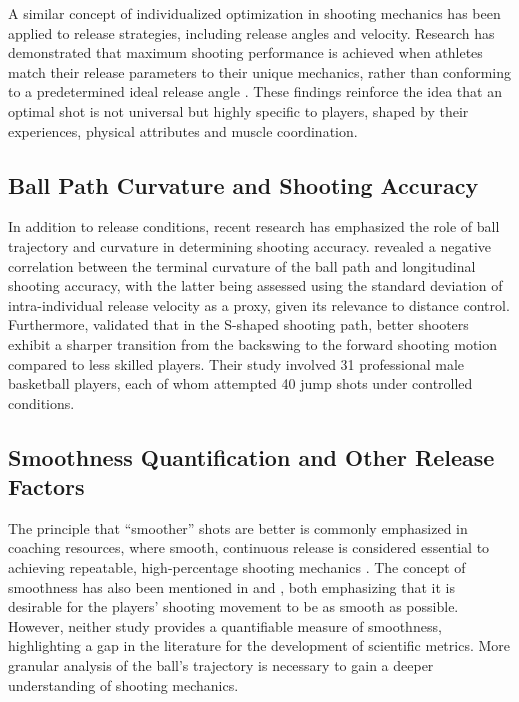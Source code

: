 \documentclass{article}
\begin{document}
      A similar concept of individualized optimization in shooting mechanics has been applied to release strategies, including release angles and velocity. Research has demonstrated that maximum shooting performance is achieved when athletes match their release parameters to their unique mechanics, rather than conforming to a predetermined ideal release angle \citep{slegers_basketball_2022}. These findings reinforce the idea that an optimal shot is not universal but highly specific to players, shaped by their experiences, physical attributes and muscle coordination. 

    \subsection{Ball Path Curvature and Shooting Accuracy}
    
      In addition to release conditions, recent research has emphasized the role of ball trajectory and curvature in determining shooting accuracy. \citet{slegers_role_2024} revealed a negative correlation between the terminal curvature of the ball path and longitudinal shooting accuracy, with the latter being assessed using the standard deviation of intra-individual release velocity as a proxy, given its relevance to distance control. Furthermore, \citet{slegers_role_2024} validated that in the S-shaped shooting path, better shooters exhibit a sharper transition from the backswing to the forward shooting motion compared to less skilled players. Their study involved 31 professional male basketball players, each of whom attempted 40 jump shots under controlled conditions. 

    \subsection{Smoothness Quantification and Other Release Factors}

      The principle that ``smoother'' shots are better is commonly emphasized in coaching resources, where smooth, continuous release is considered essential to achieving repeatable, high-percentage shooting mechanics \citep{haefner_7_2010, penny_overlooked_2016}. The concept of smoothness has also been mentioned in \citet{pakosz_muscle_2021} and \citet{tran_optimal_2008}, both emphasizing that it is desirable for the players' shooting movement to be as smooth as possible. However, neither study provides a quantifiable measure of smoothness, highlighting a gap in the literature for the development of scientific metrics. More granular analysis of the ball’s trajectory is necessary to gain a deeper understanding of shooting mechanics.
\end{document}
